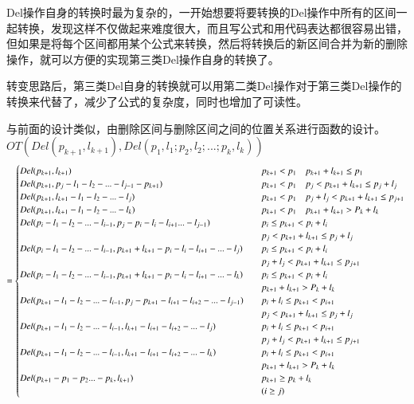 \par Del操作自身的转换时最为复杂的，一开始想要将要转换的Del操作中所有的区间一起转换，发现这样不仅做起来难度很大，而且写公式和用代码表达都很容易出错，但如果是将每个区间都用某个公式来转换，然后将转换后的新区间合并为新的删除操作，就可以方便的实现第三类Del操作自身的转换了。
\par 转变思路后，第三类Del自身的转换就可以用第二类Del操作对于第三类Del操作的转换来代替了，减少了公式的复杂度，同时也增加了可读性。
\par 与前面的设计类似，由删除区间与删除区间之间的位置关系进行函数的设计。\\
\newpage
$OT(Del(p_{k+1},l_{k+1}),Del(p_1,l_1;p_2,l_2;...;p_k,l_k))$\\
\begin{equation}
= \begin{cases}
Del(p_{k+1},l_{k+1}) \quad &p_{k+1} < p_1 \quad p_{k+1}+l_{k+1} \le p_1 \\
Del(p_{k+1},p_j-l_1-l_2-...-l_{j-1}-p_{k+1}) \quad &p_{k+1} < p_1 \quad p_j < p_{k+1}+l_{k+1} \le p_j+l_j \\
Del(p_{k+1},l_{k+1}-l_1-l_2-...-l_j) \quad &p_{k+1} < p_1 \quad p_j+l_j < p_{k+1}+l_{k+1} \le p_{j+1} \\
Del(p_{k+1},l_{k+1}-l_1-l_2-...-l_k) \quad &p_{k+1} < p_1 \quad p_{k+1}+l_{k+1} > P_k+l_k  \\

Del(p_i-l_1-l_2-...-l_{i-1},p_j-p_i-l_i-l_{i+1}...-l_{j-1})        \quad &p_i \le p_{k+1} < p_i+l_i \quad \\ &p_j < p_{k+1}+l_{k+1} \le p_j+l_j \\
Del(p_i-l_1-l_2-...-l_{i-1},p_{k+1}+l_{k+1}-p_i-l_i-l_{i+1}-...-l_j) \quad &p_i \le p_{k+1} < p_i+l_i \quad \\& p_j+l_j < p_{k+1}+l_{k+1} \le p_{j+1} \\
Del(p_i-l_1-l_2-...-l_{i-1},p_{k+1}+l_{k+1}-p_i-l_i-l_{i+1}-...-l_k) \quad &p_i \le p_{k+1} < p_i+l_i \quad \\& p_{k+1}+l_{k+1} > P_k+l_k  \\


Del(p_{k+1}-l_1-l_2-...-l_{i-1},p_j-p_{k+1}-l_{i+1}-l_{i+2}-...-l_{j-1})    \quad &p_i+l_i \le p_{k+1} < p_{i+1} \quad \\& p_j < p_{k+1}+l_{k+1} \le p_j+l_j \\
Del(p_{k+1}-l_1-l_2-...-l_{i-1},l_{k+1}-l_{i+1}-l_{i+2}-...-l_j)    \quad &p_i+l_i \le p_{k+1} < p_{i+1} \quad \\& p_j+l_j < p_{k+1}+l_{k+1} \le p_{j+1} \\
Del(p_{k+1}-l_1-l_2-...-l_{i-1},l_{k+1}-l_{i+1}-l_{i+2}-...-l_k)    \quad &p_i+l_i \le p_{k+1} < p_{i+1} \quad \\& p_{k+1}+l_{k+1} > P_k+l_k  \\
Del(p_{k+1}-p_1-p_2...-p_k,l_{k+1}) \quad &p_{k+1} \ge p_k+l_k
\\&(i \ge j)
 \end{cases}\\
\end{equation}
